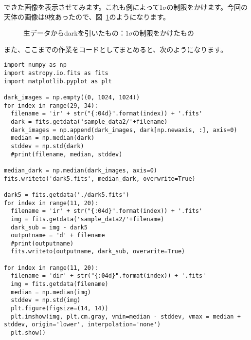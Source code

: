 できた画像を表示させてみます。これも例によって$1\sigma$の制限をかけます。今回の天体の画像は$9$枚あったので、図~\ref{fig_3_3}のようになります。
\begin{figure}
  \centering
  \caption[生データからdarkを引いたもの：$1\sigma$の制限をかけたもの]{生データからdarkを引いたもの：$1\sigma$の制限をかけたもの}
  \label{fig_3_3}
\end{figure}

また、ここまでの作業をコードとしてまとめると、次のようになります。
\begin{lstlisting}[caption=\ref{sec_3_3}~節のまとめ,label=code_3_3_6]
import numpy as np
import astropy.io.fits as fits
import matplotlib.pyplot as plt

dark_images = np.empty((0, 1024, 1024))
for index in range(29, 34):
  filename = 'ir' + str("{:04d}".format(index)) + '.fits'
  dark = fits.getdata('sample_data2/'+filename)
  dark_images = np.append(dark_images, dark[np.newaxis, :], axis=0)
  median = np.median(dark)
  stddev = np.std(dark)
  #print(filename, median, stddev)

median_dark = np.median(dark_images, axis=0)
fits.writeto('dark5.fits', median_dark, overwrite=True)

dark5 = fits.getdata('./dark5.fits')
for index in range(11, 20):
  filename = 'ir' + str("{:04d}".format(index)) + '.fits'
  img = fits.getdata('sample_data2/'+filename)
  dark_sub = img - dark5
  outputname = 'd' + filename
  #print(outputname)
  fits.writeto(outputname, dark_sub, overwrite=True)

for index in range(11, 20):
  filename = 'dir' + str("{:04d}".format(index)) + '.fits'
  img = fits.getdata(filename)
  median = np.median(img)
  stddev = np.std(img)
  plt.figure(figsize=(14, 14))
  plt.imshow(img, plt.cm.gray, vmin=median - stddev, vmax = median + stddev, origin='lower', interpolation='none')
  plt.show()
\end{lstlisting}

